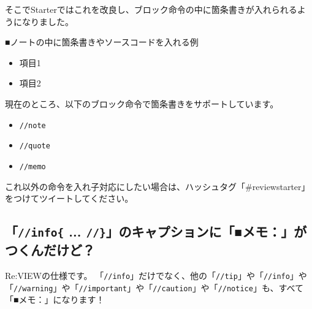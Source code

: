 そこでStarterではこれを改良し、ブロック命令の中に箇条書きが入れられるようになりました。

\begin{starterprogram}\end{starterprogram}
\noindent
{}

\starterresult
\begin{starternote}{■ノートの中に箇条書きやソースコードを入れる例}
\begin{starternoteinner}

\begin{itemize}
\item 項目1
\item 項目2
\end{itemize}

\end{starternoteinner}
\end{starternote}
\endstarterresult

現在のところ、以下のブロック命令で箇条書きをサポートしています。

\begin{itemize}
\item \texttt{//note}
\item \texttt{//quote}
\item \texttt{//memo}
\end{itemize}

これ以外の命令を入れ子対応にしたい場合は、ハッシュタグ「\#reviewstarter」をつけてツイートしてください。

\subsection{「\texttt{//info\{} ... \texttt{//\}}」のキャプションに「■メモ：」がつくんだけど？}
\label{sec:2-3-3}
\label{subsec-faq-memo}

Re:VIEWの仕様です。
「\texttt{//info}」だけでなく、他の「\texttt{//tip}」や「\texttt{//info}」や「\texttt{//warning}」や「\texttt{//important}」や「\texttt{//caution}」や「\texttt{//notice}」も、すべて「■メモ：」になります！

\begin{starterprogram}\end{starterprogram}
\noindent
{}

